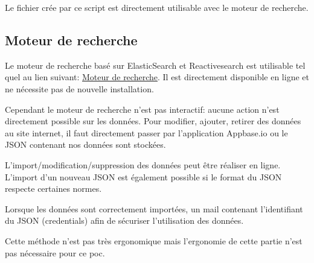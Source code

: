 Le fichier crée par ce script est directement utilisable avec le moteur de recherche.

\subsection{Moteur de recherche}
Le moteur de recherche basé sur ElasticSearch et Reactivesearch est utilisable tel quel au lien suivant: \href{https://ujcqr.csb.app}{Moteur de recherche}.
Il est directement disponible en ligne et ne nécessite pas de nouvelle installation.

Cependant le moteur de recherche n'est pas interactif: aucune action n'est directement possible sur les données. Pour modifier, ajouter, retirer des données au site internet, il faut directement passer par l'application Appbase.io ou le JSON contenant nos données sont stockées.

L'import/modification/suppression des données peut être réaliser en ligne. L'import d'un nouveau JSON est également possible si le format du JSON respecte certaines normes. 

Lorsque les données sont correctement importées, un mail contenant l'identifiant du JSON (credentials) afin de sécuriser l'utilisation des données. 

Cette méthode n'est pas très ergonomique mais l'ergonomie de cette partie n'est pas nécessaire pour ce \gls{poc}\@.
